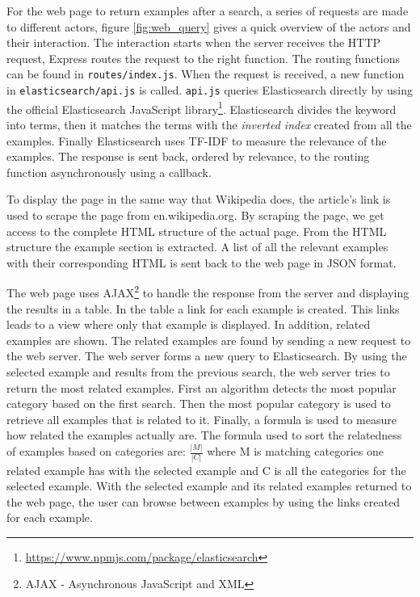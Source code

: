 For the web page to return examples after a search, a series of requests are made to different actors, figure \ref{fig:web_query} gives a quick overview of the actors and their interaction. The interaction starts when the server receives the HTTP request, Express routes the request to the right function. The routing functions can be found in \texttt{routes/index.js}. 
When the request is received, a new function in \texttt{elasticsearch/api.js} is called. \texttt{api.js} queries Elasticsearch directly by using the official Elasticsearch JavaScript  library\footnote{\url{https://www.npmjs.com/package/elasticsearch}}. Elasticsearch divides the keyword into terms, then it matches the terms with the \textit{inverted index} created from all the examples. Finally Elasticsearch uses TF-IDF to measure the relevance of the examples. The response is sent back, ordered by relevance, to the routing function asynchronously using a callback.

To display the page in the same way that Wikipedia does, the article's link is used to scrape the page from en.wikipedia.org. By scraping the page, we get access to the complete HTML structure of the actual page. From the HTML structure the example section is extracted. A list of all the relevant examples with their corresponding HTML is sent back to the web page in JSON format. 

The web page uses AJAX\footnote{AJAX - Asynchronous JavaScript and XML} to handle the response from the server and displaying the results in a table. In the table a link for each example is created. This links leads to a view where only that example is displayed. In addition, related examples are shown. The related examples are found by sending a new request to the web server. The web server forms a new query to Elasticsearch. By using the selected example and results from the previous search, the web server tries to return the most related examples. First an algorithm detects the most popular category based on the first search. Then the most popular category is used to retrieve all examples that is related to it. Finally, a formula is used to measure how related the examples actually are. The formula used to sort the relatedness of examples based on categories are: \(\frac{|M|}{|C|}\) where M is matching categories one related example has with the selected example and C is all the categories for the selected example.
With the selected example and its related examples returned to the web page, the user can browse between examples by using the links created for each example.

